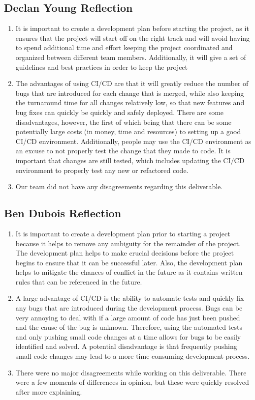 \documentclass{article}
\begin{document}
\subsection*{Declan Young Reflection}
\begin{enumerate}
    \item It is important to create a development plan before starting the project, as it ensures that the project will start off on the right track and will avoid having to spend additional time and effort keeping the project coordinated and organized between different team members. Additionally, it will give a set of guidelines and best practices in order to keep the project
    \item The advantages of using CI/CD are that it will greatly reduce the number of bugs that are introduced for each change that is merged, while also keeping the turnaround time for all changes relatively low, so that new features and bug fixes can quickly be quickly and safely deployed. There are some disadvantages, however, the first of which being that there can be some potentially large costs (in money, time and resources) to setting up a good CI/CD environment. Additionally, people may use the CI/CD environment as an excuse to not properly test the change that they made to code. It is important that changes are still tested, which includes updating the CI/CD environment to properly test any new or refactored code.
    \item Our team did not have any disagreements regarding this deliverable.
\end{enumerate}

\subsection*{Ben Dubois Reflection}
\begin{enumerate}
    \item It is important to create a development plan prior to starting a project because it helps to remove any ambiguity for the remainder of the project. The development plan helps to make crucial decisions before the project begins to ensure that it can be successful later. Also, the development plan helps to mitigate the chances of conflict in the future as it contains written rules that can be referenced in the future.
    \item A large advantage of CI/CD is the ability to automate tests and quickly fix any bugs that are introduced during the development process. Bugs can be very annoying to deal with if a large amount of code has just been pushed and the cause of the bug is unknown. Therefore, using the automated tests and only pushing small code changes at a time allows for bugs to be easily identified and solved. A potential disadvantage is that frequently pushing small code changes may lead to a more time-consuming development process.
    \item There were no major disagreements while working on this deliverable. There were a few moments of differences in opinion, but these were quickly resolved after more explaining.
\end{enumerate}
\end{document}
